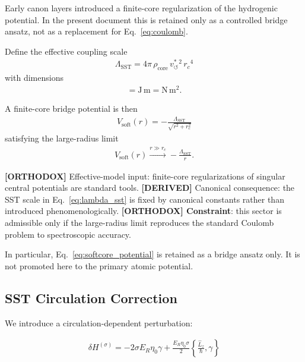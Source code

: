 \documentclass[11pt]{article}
\theoremstyle{definition}
\theoremstyle{plain}
\theoremstyle{remark}
\newcommand{\rhocore}{\rho_{\mathrm{core}}}
\newcommand{\rc}{{r_c}}
\newcommand{\vchar}{v_{\!\boldsymbol{\circlearrowleft}}^{\ast}}
\begin{document}
        Early canon layers introduced a finite-core regularization of the hydrogenic potential. In the present document this is retained only as a controlled bridge ansatz, not as a replacement for Eq.~\eqref{eq:coulomb}.

        Define the effective coupling scale
        \begin{align}
            \Lambda_{\mathrm{SST}} = 4\pi \, \rhocore \, \vchar^{2} \, \rc^{4}
            \label{eq:lambda_sst}
        \end{align}
        with dimensions
        \begin{align}
            [\Lambda_{\mathrm{SST}}] = \mathrm{J\,m} = \mathrm{N\,m^2}.
        \end{align}

        A finite-core bridge potential is then
        \begin{align}
            V_{\mathrm{soft}}(r) = -\frac{\Lambda_{\mathrm{SST}}}{\sqrt{r^2+r_c^2}}
            \label{eq:softcore_potential}
        \end{align}
        satisfying the large-radius limit
        \begin{align}
            V_{\mathrm{soft}}(r) \xrightarrow{r\gg r_c} -\frac{\Lambda_{\mathrm{SST}}}{r}.
        \end{align}

        \textbf{[ORTHODOX]} Effective-model input: finite-core regularizations of singular central potentials are standard tools.\newline
        \textbf{[DERIVED]} Canonical consequence: the SST scale in Eq.~\eqref{eq:lambda_sst} is fixed by canonical constants rather than introduced phenomenologically.\newline
        \textbf{[ORTHODOX] Constraint}: this sector is admissible only if the large-radius limit reproduces the standard Coulomb problem to spectroscopic accuracy.

        In particular, Eq.~\eqref{eq:softcore_potential} is retained as a bridge ansatz only. It is not promoted here to the primary atomic potential.

    \subsection{SST Circulation Correction}
        
        We introduce a circulation-dependent perturbation:
        
        \begin{align}
            \delta H^{(\sigma)} = -2\sigma E_R \eta_0 \gamma + \frac{E_R \eta_0 \sigma}{2} \left\{ \frac{\hat{L}_z}{\hbar}, \gamma \right\}
            \label{eq:sst_correction}
        \end{align}
        
\end{document}

